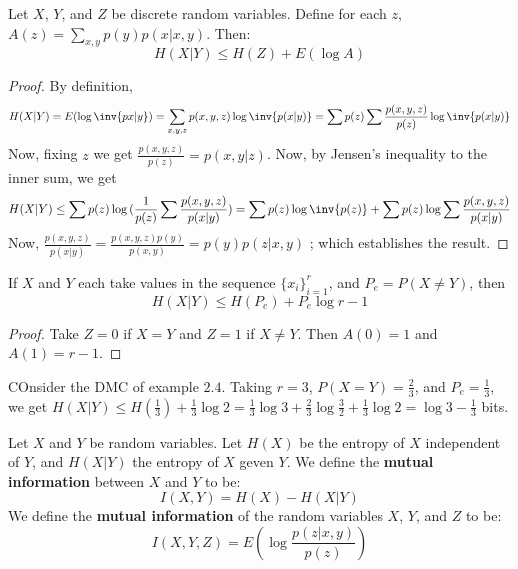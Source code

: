 \begin{theorem}\label{2.1.4}
    Let $X$,  $Y$, and  $Z$ be discrete random variables. Define for each  $z$,
     $A(z)=\sum_{x,y}{p(y)p(x|x,y)}$. Then:
     \begin{equation}
         H(X|Y) \leq H(Z)+E(\log{A})
     \end{equation}
\end{theorem}
\begin{proof}
    By definition,
     \begin{equation*}
        H(X|Y)=E(\log{\inv{p{x|y}}})=\sum_{x,y,z}{p(x,y,
        z)\log{\inv{p(x|y)}}}=\sum{p(z)}\sum\frac{p(x,y,z)}{p(z)}\log{\inv{p(x|y)}}
     \end{equation*}
    Now, fixing $z$ we get $\frac{p(x,y,z)}{p(z)}=p(x,y|z)$. Now, by Jensen's
    inequality to the inner sum, we get
    \begin{equation*}
        H(X|Y) \leq
        \sum{p(z)}\log{(\frac{1}{p(z)}\sum{\frac{p(x,y,
        z)}{p(x|y)}})}=\sum{p(z)\log{\inv{p(z)}}}+\sum{p(z)\log{\sum{\frac{p(x,y,
        z)}{p(x|y)}}}}
    \end{equation*}
    Now, $\frac{p(x,y,z)}{p(x|y)}=\frac{p(x,y,z)p(y)}{p(x,y)}=p(y)p(z|x,y)$ ;
    which establishes the result.
\end{proof}
\begin{corollary}
    If $X$ and $Y$ each take values in the sequence $\{x_i\}_{i=1}^r$, and
    $P_e=P(X \neq Y)$, then
    \begin{equation}
        H(X|Y) \leq H(P_e)+P_e\log{r-1}
    \end{equation}
\end{corollary}
\begin{proof}
    Take $Z=0$ if  $X=Y$ and  $Z=1$ if  $X \neq Y$. Then  $A(0)=1$ and
    $A(1)=r-1$.
\end{proof}

\begin{example}
    COnsider the DMC of example $2.4$. Taking  $r=3$,  $P(X=Y)=\frac{2}{3}$, and
    $P_e=\frac{1}{3}$, we get $H(X|Y) \leq
    H(\frac{1}{3})+\frac{1}{3}\log{2}=\frac{1}{3}\log{3}+\frac{2}{3}\log{\frac{3}{2}}+
    \frac{1}{3}\log{2}=\log{3}-\frac{1}{3}$ bits.
\end{example}

\begin{definition}
    Let $X$ and  $Y$ be random variables. Let $H(X)$ be the entropy of $X$
    independent of  $Y$, and $H(X|Y)$ the entropy of $X$ geven  $Y$. We define
    the  \textbf{mutual information} between $X$ and  $Y$ to be:
    \begin{equation}
        I(X,Y)=H(X)-H(X|Y)
    \end{equation}
    We define the \textbf{mutual information} of the random variables $X$,  $Y$,
    and  $Z$ to be:
    \begin{equation}
        I(X,Y,Z)=E(\log{\frac{p(z|x,y)}{p(z)}})
    \end{equation}
\end{definition}


